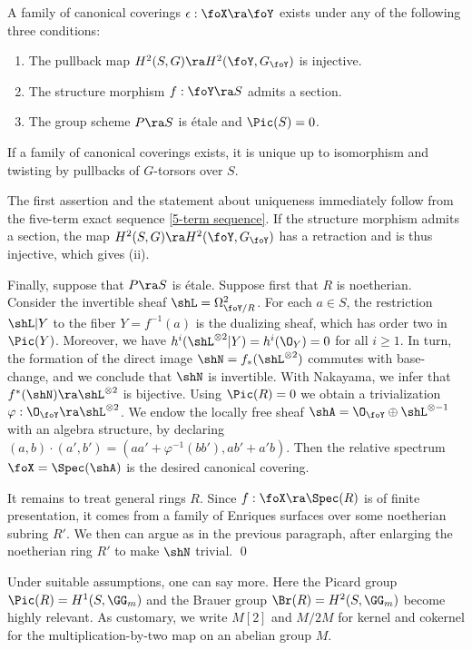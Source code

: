 \begin{proposition}
\notready
\label{canonical covering}
A family of canonical coverings $\epsilon:\foX\ra\foY$ exists
under any of the following three conditions:
\begin{enumerate}
\item The pullback map $H^2(S,G)\ra H^2(\foY,G_\foY)$ is injective.
\item The   structure morphism $f:\foY\ra S$ admits a section.
\item The group scheme $P\ra S$ is \'etale and $\Pic(S)=0$.
\end{enumerate}
If a family of canonical coverings exists,  it is unique up to isomorphism and twisting by  pullbacks of $G$-torsors over $S$.
\end{proposition}

\proof
The first assertion and the statement about uniqueness immediately follow from
the five-term exact sequence \eqref{5-term sequence}.
If the structure morphism admits a section, the map $H^2(S,G)\ra H^2(\foY,G_\foY)$ has a retraction and is thus injective,
which gives (ii).

Finally, suppose that $P\ra S$ is \'etale. Suppose first that $R$ is noetherian.
Consider the invertible sheaf $\shL=\Omega^2_{\foY/R}$.
For each $a\in S$, the restriction $\shL|Y$ to the fiber $Y=f^{-1}(a)$ is the dualizing sheaf, which has order two
in $\Pic(Y)$. Moreover, we have $h^i(\shL^{\otimes 2}|Y)=h^i(\O_Y)=0$ for all $i\geq 1$. In turn, the formation of the direct image
$\shN=f_*(\shL^{\otimes 2})$ commutes with base-change, and we conclude that $\shN$ is invertible.
With Nakayama, we infer that $f^*(\shN)\ra \shL^{\otimes 2}$ is bijective.
Using $\Pic(R)=0$ we obtain a trivialization $\varphi:\O_\foY\ra\shL^{\otimes 2}$.
We endow the locally free sheaf
$\shA=\O_\foY\oplus\shL^{\otimes -1}$
with an  algebra structure, by declaring $(a,b)\cdot (a',b') = (aa'+\varphi^{-1}(bb'), ab'+a'b)$.
Then the relative spectrum $\foX=\Spec(\shA)$ is the desired canonical covering.

It remains to treat general rings $R$. Since   $f:\foX\ra\Spec(R)$ is of finite presentation, it comes
from a family of Enriques surfaces over some noetherian subring $R'$. We then can argue as in the previous paragraph,
after enlarging the noetherian ring $R'$ to make $\shN$ trivial.
\qed

\iffalse
Under suitable assumptions, one can say more. Here the Picard group $\Pic(R)=H^1(S,\GG_m)$
and the Brauer group $\Br(R)=H^2(S,\GG_m)$ become highly relevant.
As customary, we write   $M[2]$ and $M/2M$
for kernel and  cokernel for the multiplication-by-two map on an abelian group $M$.

